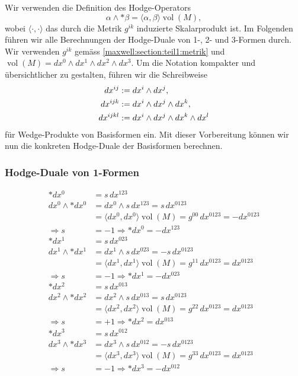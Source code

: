 Wir verwenden die Definition des Hodge-Operators
\begin{equation*}
	\alpha \wedge \ast \beta = \langle \alpha, \beta \rangle \operatorname{vol}(M),
\end{equation*}
wobei $\langle \cdot , \cdot \rangle$ das durch die Metrik $g^{ik}$ induzierte Skalarprodukt ist.
Im Folgenden führen wir alle Berechnungen der Hodge-Duale von 1-, 2- und 3-Formen durch.
Wir verwenden $g^{ik}$ gemäss \eqref{maxwell:section:teil1:metrik} und $\operatorname{vol}(M) = dx^0 \wedge dx^1 \wedge dx^2 \wedge dx^3$.
Um die Notation kompakter und übersichtlicher zu gestalten, führen wir die Schreibweise 
\begin{align}
	dx^{ij} &:= dx^i \wedge dx^j, 
	\label{maxwell:hodge:zwei}
	\\
	dx^{ijk} &:= dx^i \wedge dx^j \wedge dx^k, 
	\label{maxwell:hodge:drei}
	\\
	dx^{ijkl} & := dx^i \wedge dx^j \wedge dx^k \wedge dx^l
	\notag
\end{align}
für Wedge-Produkte von Basisformen ein.
Mit dieser Vorbereitung können wir nun die konkreten Hodge-Duale der Basisformen berechnen.
\subsubsection{Hodge-Duale von 1-Formen}
\begin{align*}
	\ast dx^0 
	&= s \, dx^{123} \\
	dx^0 \wedge \ast dx^0 
	&= dx^0 \wedge s \, dx^{123} = s \, dx^{0123} \\
	&= \langle dx^0, dx^0 \rangle \operatorname{vol}(M) = g^{00} \, dx^{0123} = -dx^{0123} \\
	\Rightarrow s &= -1 \Rightarrow \boxed{\ast dx^0 = - dx^{123}}
	\\[1em]
	\ast dx^1 
	&= s \, dx^{023} \\
	dx^1 \wedge \ast dx^1 
	&= dx^1 \wedge s \, dx^{023} = -s \, dx^{0123} \\
	&= \langle dx^1, dx^1 \rangle \operatorname{vol}(M) = g^{11} \, dx^{0123} = dx^{0123} \\
	\Rightarrow s &= -1 \Rightarrow \boxed{\ast dx^1 = - dx^{023}}
	\\[1em]
	\ast dx^2 
	&= s \, dx^{013} \\
	dx^2 \wedge \ast dx^2 
	&= dx^2 \wedge s \, dx^{013} = s \, dx^{0123} \\
	&= \langle dx^2, dx^2 \rangle \operatorname{vol}(M) = g^{22} \, dx^{0123} = dx^{0123} \\
	\Rightarrow s &= +1 \Rightarrow \boxed{\ast dx^2 = dx^{013}}
	\\[1em]
	\ast dx^3 
	&= s \, dx^{012} \\
	dx^3 \wedge \ast dx^3 
	&= dx^3 \wedge s \, dx^{012} = -s \, dx^{0123} \\
	&= \langle dx^3, dx^3 \rangle \operatorname{vol}(M) = g^{33} \, dx^{0123} = dx^{0123} \\
	\Rightarrow s &= -1 \Rightarrow \boxed{\ast dx^3 = - dx^{012}}
\end{align*}

